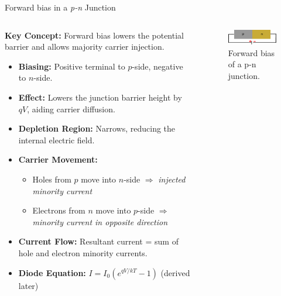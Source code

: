 \begin{frame}{Forward bias in a \textit{p-n} Junction}
	\begin{columns}
		\begin{column}{0.7\textwidth}
			\textbf{Key Concept:} Forward bias lowers the potential barrier and allows majority carrier injection.
			\begin{itemize}
				\item \textbf{Biasing:} Positive terminal to $p$-side, negative to $n$-side.
				\item \textbf{Effect:} Lowers the junction barrier height by $qV$, aiding carrier diffusion.
				\item \textbf{Depletion Region:} Narrows, reducing the internal electric field.
				\item \textbf{Carrier Movement:}
				\begin{itemize}
					\item Holes from $p$ move into $n$-side $\Rightarrow$ \textit{injected minority current}
					\item Electrons from $n$ move into $p$-side $\Rightarrow$ \textit{minority current in opposite direction}
				\end{itemize}
				\item \textbf{Current Flow:} Resultant current = sum of hole and electron minority currents.
				\item \textbf{Diode Equation:} $I = I_0 \left(e^{qV/kT} - 1\right)$ (derived later)
    	\end{itemize}
	\end{column}
		\begin{column}{0.3\textwidth}
			\begin{figure}
				\centering
				\includegraphics[scale=1]{fig/lec03/pn_forward_bias.pdf}
				\caption{Forward bias of a p-n junction.}
				\label{fig:forward_bias_pn_junction}
			\end{figure}
		\end{column}
	\end{columns}
\end{frame}


